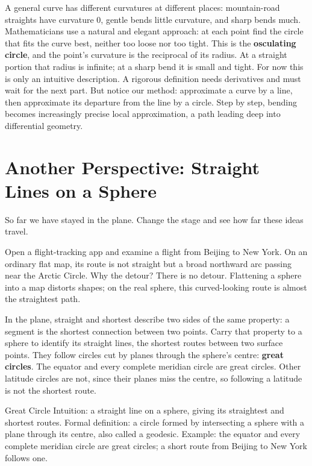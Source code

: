 A general curve has different curvatures at different places: mountain-road straights have curvature $0$, gentle bends little curvature, and sharp bends much. Mathematicians use a natural and elegant approach: at each point find the circle that fits the curve best, neither too loose nor too tight. This is the \textbf{osculating circle}, and the point's curvature is the reciprocal of its radius. At a straight portion that radius is infinite; at a sharp bend it is small and tight. For now this is only an intuitive description. A rigorous definition needs derivatives and must wait for the next part. But notice our method: approximate a curve by a line, then approximate its departure from the line by a circle. Step by step, bending becomes increasingly precise local approximation, a path leading deep into differential geometry.

\section{Another Perspective: Straight Lines on a Sphere}

So far we have stayed in the plane. Change the stage and see how far these ideas travel.

Open a flight-tracking app and examine a flight from Beijing to New York. On an ordinary flat map, its route is not straight but a broad northward arc passing near the Arctic Circle. Why the detour? There is no detour. Flattening a sphere into a map distorts shapes; on the real sphere, this curved-looking route is almost the straightest path.

In the plane, straight and shortest describe two sides of the same property: a segment is the shortest connection between two points. Carry that property to a sphere to identify its straight lines, the shortest routes between two surface points. They follow circles cut by planes through the sphere's centre: \textbf{great circles}. The equator and every complete meridian circle are great circles. Other latitude circles are not, since their planes miss the centre, so following a latitude is not the shortest route.

\begin{shuyu}{Great Circle}
Intuition: a straight line on a sphere, giving its straightest and shortest routes. Formal definition: a circle formed by intersecting a sphere with a plane through its centre, also called a geodesic. Example: the equator and every complete meridian circle are great circles; a short route from Beijing to New York follows one.
\end{shuyu}

